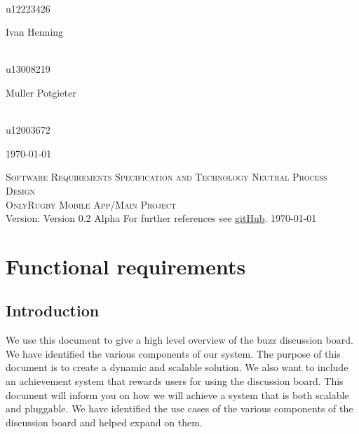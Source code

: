 \documentclass[a4paper,12pt]{report}
\begin{document}
\begin{titlepage}
\begin{center}
\begin{minipage}{0.4\textwidth}
\end{minipage}
\begin{minipage}{0.4\textwidth}
\begin{flushright} \large
\emph{} \\
u12223426
\end{flushright}
\end{minipage}
\begin{minipage}{0.4\textwidth}
\begin{flushleft} \large
Ivan {Henning}
\end{flushleft}
\end{minipage}
\begin{minipage}{0.4\textwidth}
\begin{flushright} \large
\emph{} \\
u13008219
\end{flushright}
\end{minipage}
\begin{minipage}{0.4\textwidth}
\begin{flushleft} \large
Muller {Potgieter}
\end{flushleft}
\end{minipage}
\begin{minipage}{0.4\textwidth}
\begin{flushright} \large
\emph{} \\
u12003672
\end{flushright}
\end{minipage}
\vfill
{\large \today}
\end{center}
\end{titlepage}
\footnotesize
%
\normalsize

\renewcommand{\thesection}{\arabic{section}}
\newpage
\begin{center}
\textsc{\LARGE Software Requirements Specification and Technology Neutral Process Design}\\[1.5cm]
\textsc{\Large OnlyRugby Mobile App/Main Project}\\[0.5cm]
Version: Version 0.2 Alpha 
For further references see \href{ https://github.com/hermankeuris/OnlyRugbyApp.git}{gitHub}.
\today
\end{center}
\tableofcontents{}
\newpage
\section{Functional requirements}
\subsection{Introduction}
We use this document to give a high level overview of the buzz  discussion board. We have identified the various components of our system. The purpose of this document is to create a dynamic and scalable solution. We also want to include an achievement system that rewards users for using the discussion board. This document will inform you on how we will achieve a system that is both scalable and pluggable. We have identified the use cases of the various components of the discussion board and helped expand on them.
\end{document}
